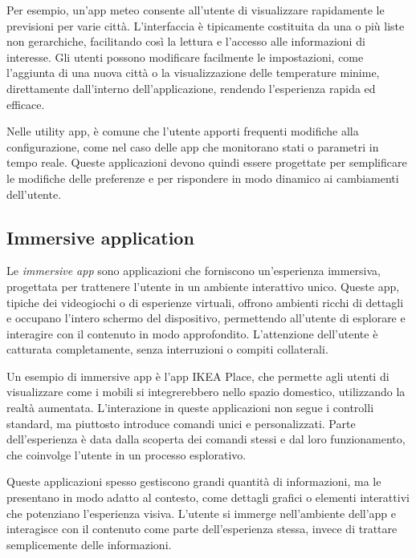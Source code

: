 Per esempio, un’app meteo consente all’utente di visualizzare rapidamente le previsioni per varie città. L’interfaccia è tipicamente costituita da una o più liste non gerarchiche, facilitando così la lettura e l’accesso alle informazioni di interesse. Gli utenti possono modificare facilmente le impostazioni, come l’aggiunta di una nuova città o la visualizzazione delle temperature minime, direttamente dall’interno dell’applicazione, rendendo l’esperienza rapida ed efficace.

Nelle utility app, è comune che l’utente apporti frequenti modifiche alla configurazione, come nel caso delle app che monitorano stati o parametri in tempo reale. Queste applicazioni devono quindi essere progettate per semplificare le modifiche delle preferenze e per rispondere in modo dinamico ai cambiamenti dell’utente.

\subsection{Immersive application}
Le \textit{immersive app} sono applicazioni che forniscono un’esperienza immersiva, progettata per trattenere l’utente in un ambiente interattivo unico. Queste app, tipiche dei videogiochi o di esperienze virtuali, offrono ambienti ricchi di dettagli e occupano l’intero schermo del dispositivo, permettendo all'utente di esplorare e interagire con il contenuto in modo approfondito. L’attenzione dell’utente è catturata completamente, senza interruzioni o compiti collaterali.

Un esempio di immersive app è l’app IKEA Place, che permette agli utenti di visualizzare come i mobili si integrerebbero nello spazio domestico, utilizzando la realtà aumentata. L'interazione in queste applicazioni non segue i controlli standard, ma piuttosto introduce comandi unici e personalizzati. Parte dell’esperienza è data dalla scoperta dei comandi stessi e dal loro funzionamento, che coinvolge l’utente in un processo esplorativo.

Queste applicazioni spesso gestiscono grandi quantità di informazioni, ma le presentano in modo adatto al contesto, come dettagli grafici o elementi interattivi che potenziano l'esperienza visiva. L’utente si immerge nell’ambiente dell’app e interagisce con il contenuto come parte dell’esperienza stessa, invece di trattare semplicemente delle informazioni.

